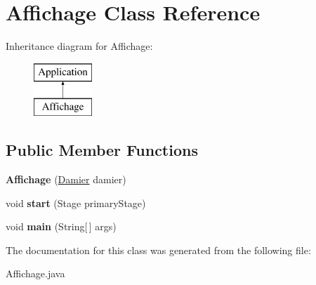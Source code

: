 \hypertarget{class_affichage}{}\section{Affichage Class Reference}
\label{class_affichage}
Inheritance diagram for Affichage\+:\begin{figure}[H]
\begin{center}
\leavevmode
\includegraphics[height=2.000000cm]{class_affichage}
\end{center}
\end{figure}
\subsection*{Public Member Functions}
\begin{DoxyCompactItemize}
\item 
{\bfseries Affichage} (\hyperlink{class_damier}{Damier} damier)\hypertarget{class_affichage_a93128b3855e316b8e42c098f698a9b76}{}\label{class_affichage_a93128b3855e316b8e42c098f698a9b76}

\item 
void {\bfseries start} (Stage primary\+Stage)\hypertarget{class_affichage_a00681ef021675df896e280e8585b43f9}{}\label{class_affichage_a00681ef021675df896e280e8585b43f9}

\item 
void {\bfseries main} (String\mbox{[}$\,$\mbox{]} args)\hypertarget{class_affichage_abcbe888db7858bdcea3d1476cea127db}{}\label{class_affichage_abcbe888db7858bdcea3d1476cea127db}

\end{DoxyCompactItemize}


The documentation for this class was generated from the following file\+:\begin{DoxyCompactItemize}
\item 
Affichage.\+java\end{DoxyCompactItemize}
